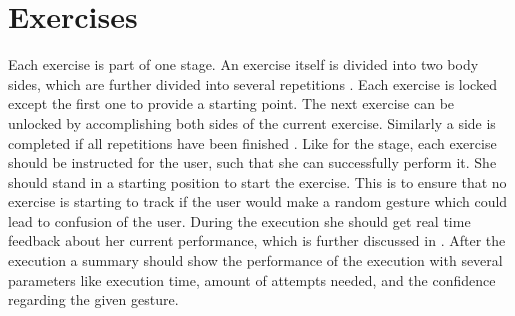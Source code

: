 \section{Exercises}\label{4_5_exercises}
Each exercise is part of one stage. An exercise itself is divided into two body sides, which are further divided into several repetitions . Each exercise is locked except the first one to provide a starting point. The next exercise can be unlocked by accomplishing both sides of the current exercise. Similarly a side is completed if all repetitions have been finished . Like for the stage, each exercise should be instructed for the user, such that she can successfully perform it. She should stand in a starting position to start the exercise. This is to ensure that no exercise is starting to track if the user would make a random gesture which could lead to confusion of the user. During the execution she should get real time feedback about her current performance, which is further discussed in \textbf{}. After the execution a summary should show the performance of the execution with several parameters like execution time, amount of attempts needed, and the confidence regarding the given gesture.

